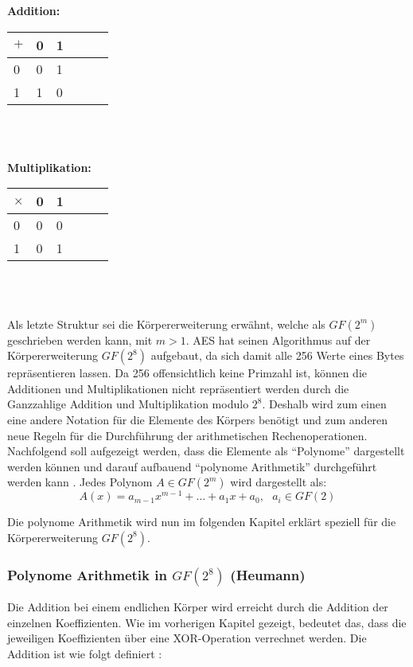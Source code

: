  \begin{minipage}{0.5\textwidth}
\textbf{Addition:} \\
    \begin{tabular}{l|lllll}
    $+$  & 0 & 1 \\ \hline
    0 	  & 0 & 1 \\
    1       & 1 & 0 \\
    \end{tabular}
    \\
    \\
\end{minipage}
\begin{minipage}{0.5\textwidth}
\textbf{Multiplikation:} \\
    \begin{tabular}{l|lllll}
    $\times$ & 0 & 1 \\ \hline
    0 	        & 0 & 0 \\
    1             & 0 & 1 \\
    \end{tabular}
    \\
    \\
\end{minipage}
 
 Als letzte Struktur sei die Körpererweiterung erwähnt, welche als $GF(2^m)$ geschrieben werden kann,
 mit $m > 1$. AES hat seinen Algorithmus auf der Körpererweiterung $GF(2^8)$ aufgebaut, da sich damit
 alle 256 Werte eines Bytes repräsentieren lassen. Da 256 offensichtlich keine Primzahl ist, können die
 Additionen und Multiplikationen nicht repräsentiert werden durch die Ganzzahlige Addition und Multiplikation
 modulo $2^8$. Deshalb wird zum einen eine andere Notation für die Elemente des Körpers benötigt und
 zum anderen neue Regeln für die Durchführung der arithmetischen Rechenoperationen. Nachfolgend soll
 aufgezeigt werden, dass die Elemente als ``Polynome'' dargestellt werden können und darauf aufbauend
 ``polynome Arithmetik'' durchgeführt werden kann \cite{paar10}. Jedes Polynom $A \in GF(2^m)$ wird
 dargestellt als:
 \begin{equation*}
   A(x) = a_{m-1}x^{m-1} + \hdots + a_1x + a_0, ~~~ a_i \in GF(2)
 \end{equation*}
 
 Die polynome Arithmetik wird nun im folgenden Kapitel erklärt speziell für die Körpererweiterung
 $GF(2^8)$.
 
 \subsubsection{Polynome Arithmetik in $GF(2^8)$ (Heumann)}
 \label{polynome-arithmetic}
 Die Addition bei einem endlichen Körper wird erreicht durch die Addition der einzelnen Koeffizienten. Wie
 im vorherigen Kapitel gezeigt, bedeutet das, dass die jeweiligen Koeffizienten über eine XOR-Operation
 verrechnet werden. Die Addition ist wie folgt definiert \cite{paar10}:
 
